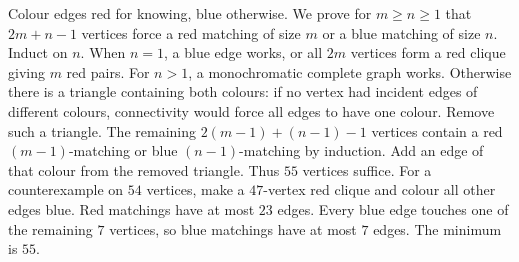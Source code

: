 Colour edges red for knowing, blue otherwise. We prove for $m\ge n\ge1$ that $2m+n-1$ vertices force a red matching of size $m$ or a blue matching of size $n$. Induct on $n$. When $n=1$, a blue edge works, or all $2m$ vertices form a red clique giving $m$ red pairs.
For $n>1$, a monochromatic complete graph works. Otherwise there is a triangle containing both colours: if no vertex had incident edges of different colours, connectivity would force all edges to have one colour. Remove such a triangle. The remaining $2(m-1)+(n-1)-1$ vertices contain a red $(m-1)$-matching or blue $(n-1)$-matching by induction. Add an edge of that colour from the removed triangle. Thus $55$ vertices suffice.
For a counterexample on $54$ vertices, make a $47$-vertex red clique and colour all other edges blue. Red matchings have at most $23$ edges. Every blue edge touches one of the remaining $7$ vertices, so blue matchings have at most $7$ edges. The minimum is $\boxed{55}$.
